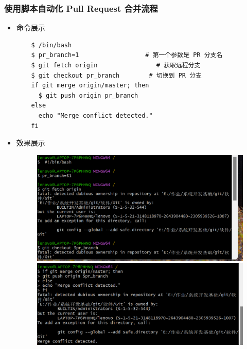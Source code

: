 \documentclass[UTF8]{ctexart}
\begin{document}
\subsubsection{使用脚本自动化 Pull Request 合并流程}\begin{itemize}
  \item 命令展示
  \begin{verbatim}
    $ /bin/bash
    $ pr_branch=1                  # 第一个参数是 PR 分支名
    $ git fetch origin                # 获取远程分支
    $ git checkout pr_branch        # 切换到 PR 分支
    if git merge origin/master; then
      $ git push origin pr_branch
    else
      echo "Merge conflict detected."
    fi
  \end{verbatim}
\item 效果展示
\begin{figure}[H]
\includegraphics[width=1\textwidth]{16}
\includegraphics[width=1\textwidth]{17}
\end{figure}
\end{itemize}
\end{document}

